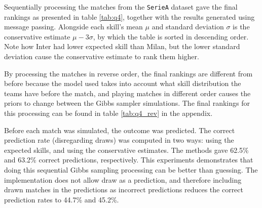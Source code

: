 \documentclass{article}
\begin{document}
	Sequentially processing the matches from the \texttt{SerieA} dataset gave the final rankings as presented in table \ref{tab:q4}, together with the results generated using message passing.
	Alongside each skill's mean $\mu$ and standard deviation $ \sigma $ is the conservative estimate $\mu - 3\sigma$, by which the table is sorted in descending order.
	Note how Inter had lower expected skill than Milan, but the lower standard deviation cause the conservative estimate to rank them higher.
	
	By processing the matches in reverse order, the final rankings are different from before because the model used takes into account what skill distribution the teams have before the match, and playing matches in different order causes the priors to change between the Gibbs sampler simulations. The final rankings for this processing can be found in table \ref{tab:q4_rev} in the appendix.
	
	Before each match was simulated, the outcome was predicted. The correct prediction rate (disregarding draws) was computed in two ways: using the expected skills, and using the conservative estimates. The methods gave 62.5\% and 63.2\% correct predictions, respectively. This experiments demonstrates that doing this sequential Gibbs sampling processing can be better than guessing. 
	The implementation does not allow draw as a prediction, and therefore including drawn matches in the predictions as incorrect predictions reduces the correct prediction rates to 44.7\% and 45.2\%.
\end{document}
